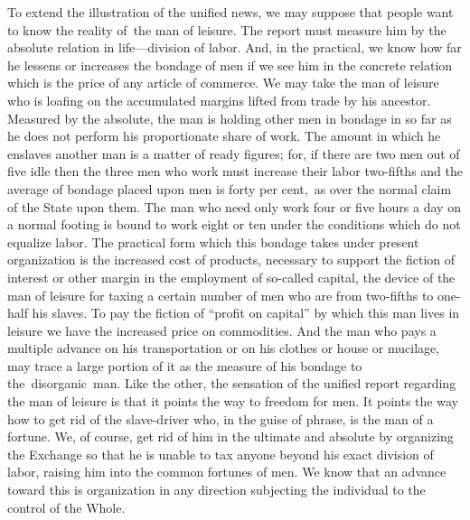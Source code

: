 \documentclass[twoside,symmetric,nobib,justified]{tufte-book}
\begin{document}
To extend the illustration of the unified news, we may suppose that
people want to know the reality of~the man of leisure. The report must
measure him by the absolute relation in life---division of labor. And,
in the practical, we know how far he lessens or increases the bondage of
men if we see him in the concrete relation which is the price of any
article of commerce. We may take the man of leisure who is loafing on
the accumulated margins lifted from trade by his ancestor. Measured by
the absolute, the man is holding other men in bondage in so far as he
does not perform his proportionate share of work. The amount in which he
enslaves another man is a matter of ready figures; for, if there are two
men out of five idle then the three men who work must increase their
labor two-fifths and the average of bondage placed upon men is forty per
cent,~as over the normal claim of the State upon them. The man who need
only work four or five hours a day on a normal footing is bound to work
eight or ten under the conditions which do not equalize labor. The
practical form which this bondage takes under present organization is
the increased cost of products, necessary to support the fiction of
interest or other margin in the employment of so-called capital, the
device of the man of leisure for taxing a certain number of men who are
from two-fifths to one-half his slaves. To pay the fiction of ``profit
on capital'' by which this man lives in leisure we have the increased
price on commodities. And the man who pays a multiple advance on his
transportation or on his clothes or house or mucilage, may trace a large
portion of it as the measure of his bondage to the~disorganic~man. Like
the other, the sensation of the unified report regarding the man of
leisure is that it points the way to freedom for men. It points the way
how to get rid of the slave-driver who, in the guise of phrase, is the
man of a fortune. We, of course, get rid of him in the ultimate and
absolute by organizing the Exchange so that he is unable to tax anyone
beyond his exact division of labor, raising him into the common fortunes
of men. We know that an advance toward this is organization in any
direction subjecting the individual to the control of the Whole.~
\end{document}
